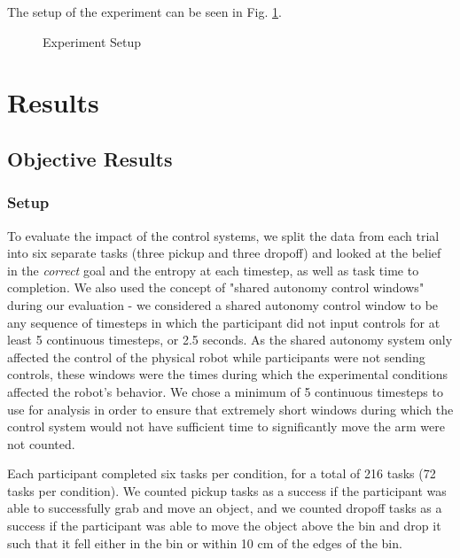 \documentclass[conference]{IEEEtran}
\begin{document}
The setup of the experiment can be seen in Fig. \ref{exp_setup}.

\begin{figure}
\caption{Experiment Setup}
\label{exp_setup}
\end{figure}

\section{Results}
\subsection{Objective Results}
\subsubsection{Setup}
To evaluate the impact of the control systems, we split the data from each trial into six separate tasks (three pickup and three dropoff) and looked at the belief in the \textit{correct} goal and the entropy at each timestep, as well as task time to completion. We also used the concept of "shared autonomy control windows" during our evaluation - we considered a shared autonomy control window to be any sequence of timesteps in which the participant did not input controls for at least 5 continuous timesteps, or 2.5 seconds. As the shared autonomy system only affected the control of the physical robot while participants were not sending controls, these windows were the times during which the experimental conditions affected the robot's behavior. We chose a minimum of 5 continuous timesteps to use for analysis in order to ensure that extremely short windows during which the control system would not have sufficient time to significantly move the arm were not counted.

Each participant completed six tasks per condition, for a total of 216 tasks (72 tasks per condition). We counted pickup tasks as a success if the participant was able to successfully grab and move an object, and we counted dropoff tasks as a success if the participant was able to move the object above the bin and drop it such that it fell either in the bin or within 10 cm of the edges of the bin. 
\end{document}
